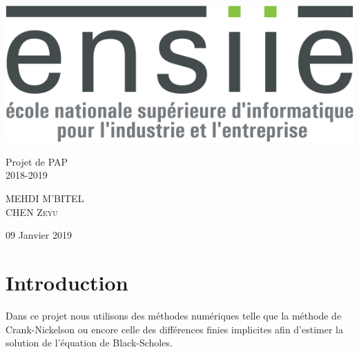 \documentclass[a4paper, 12pt]{article}
\begin{document}
\begin{titlepage}
			\includegraphics[scale=0.25]{Images/Logo_transparent.png} 
			\begin{center}

				\vspace*{6cm}
				{ \huge  
				Projet de PAP \\
				2018-2019 \\ }
			\vspace*{3cm}
				\begin{center} \large
					\textsc{MEHDI} \textsc{M'BITEL}\\
					\textsc{CHEN} \textsc{Zeyu}		
				\end{center}
				\begin{minipage}{0.4\textwidth}
				
				\end{minipage}

				{\large 09 Janvier 2019}
			\end{center}
	\end{titlepage}


	\renewcommand{\contentsname}{Sommaire} 
	{\setlength{\baselineskip}{1.2\baselineskip}
\tableofcontents\par}%
	
	

	\newpage
	\vspace*{3cm} %
\section{Introduction}
Dans ce projet nous utilisons des méthodes numériques telle que la méthode de Crank-Nickelson ou encore celle des différences finies implicites afin d'estimer la solution de l'équation de Black-Scholes.
\end{document}
